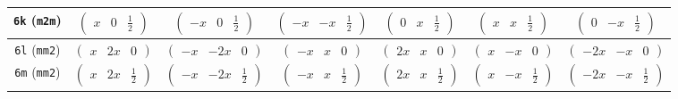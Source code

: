 \documentclass[fleqn,9pt,landscape]{jsarticle}
\begin{document}
\begin{center}
\begin{longtable}{ccccccc}
{\tt 6k} ({\tt m2m}) & $ \begin{pmatrix} x & 0 & \frac{1}{2} \end{pmatrix} $ & $ \begin{pmatrix} - x & 0 & \frac{1}{2} \end{pmatrix} $ & $ \begin{pmatrix} - x & - x & \frac{1}{2} \end{pmatrix} $ & $ \begin{pmatrix} 0 & x & \frac{1}{2} \end{pmatrix} $ & $ \begin{pmatrix} x & x & \frac{1}{2} \end{pmatrix} $ & $ \begin{pmatrix} 0 & - x & \frac{1}{2} \end{pmatrix} $ \\ \hline
{\tt 6l} ({\tt mm2}) & $ \begin{pmatrix} x & 2 x & 0 \end{pmatrix} $ & $ \begin{pmatrix} - x & - 2 x & 0 \end{pmatrix} $ & $ \begin{pmatrix} - x & x & 0 \end{pmatrix} $ & $ \begin{pmatrix} 2 x & x & 0 \end{pmatrix} $ & $ \begin{pmatrix} x & - x & 0 \end{pmatrix} $ & $ \begin{pmatrix} - 2 x & - x & 0 \end{pmatrix} $ \\ \hline
{\tt 6m} ({\tt mm2}) & $ \begin{pmatrix} x & 2 x & \frac{1}{2} \end{pmatrix} $ & $ \begin{pmatrix} - x & - 2 x & \frac{1}{2} \end{pmatrix} $ & $ \begin{pmatrix} - x & x & \frac{1}{2} \end{pmatrix} $ & $ \begin{pmatrix} 2 x & x & \frac{1}{2} \end{pmatrix} $ & $ \begin{pmatrix} x & - x & \frac{1}{2} \end{pmatrix} $ & $ \begin{pmatrix} - 2 x & - x & \frac{1}{2} \end{pmatrix} $ \\ \hline

\end{longtable}
\end{center}
\end{document}
